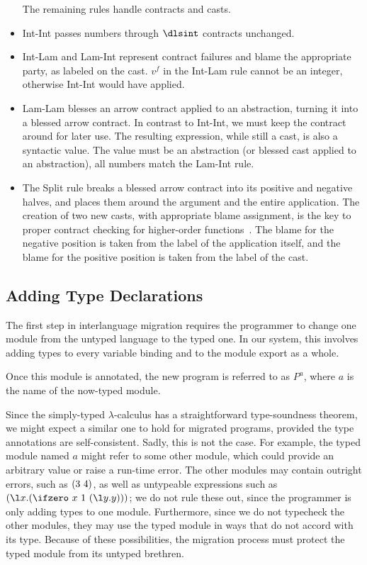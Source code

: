 \begin{schemeregion}
\begin{itemize}
The remaining rules handle contracts and casts. 
\item  {\sc Int-Int} passes numbers through $\dlsint$ contracts unchanged. 
  
\item {\sc Int-Lam} and {\sc Lam-Int} represent contract failures and
  blame the appropriate party, as labeled on the cast.  $v^f$ in the
  {\sc Int-Lam} rule cannot be an integer, otherwise {\sc Int-Int}
  would have applied.

\item {\sc Lam-Lam} blesses an arrow contract applied to an
  abstraction, turning it into a blessed arrow contract.  In contrast
  to {\sc Int-Int}, we must keep the contract around for later use.
  The resulting expression, while still a cast, is also a syntactic
  value.  The value must be an abstraction (or blessed cast applied to
  an abstraction), all numbers match the {\sc Lam-Int} rule.

\item The {\sc Split} rule breaks a blessed arrow
  contract into its positive and negative halves, and places them around
  the argument and the entire application.  The creation of two new
  casts, with appropriate blame assignment, is the key to proper
  contract checking for higher-order functions~\cite{ff:ho-contracts}.
  The blame for the negative position is taken from the label of the
  application itself, and the blame for the positive position is taken
  from the label of the cast.

\end{itemize}

\renewcommand\tau{a}
\newmeta{}

\subsection{Adding Type Declarations}

The first step in interlanguage migration requires
the programmer to change one module from the untyped language to the
typed one.  In our system, this involves adding types to every
variable binding
and to the module export as a whole.

Once this module is annotated, the new program is referred to as
$P^\tau$, where $\tau$ is the name of the now-typed module.

Since the simply-typed $\lambda$-calculus has a straightforward
type-soundness theorem, we might expect a similar one to hold for
migrated programs,
provided the type annotations are self-consistent.  Sadly, this is not the case.
For example, the typed module named $\tau$ might refer to some
other module, which could provide an arbitrary value or raise a
run-time error.  The other modules may contain outright errors, such
as $(3\ 4)$, as well as untypeable expressions such as
$\dlsabs{x}{\ifz{x}{1}{\dlsabs{y}{y}}}$; we do not rule these out, since the
programmer is only adding types to one module.  Furthermore, since we
do not typecheck the other modules, they may use the typed module in
ways that do not accord with its type.  Because of these
possibilities, the migration process must protect the typed module
from its untyped brethren.


\end{schemeregion}
